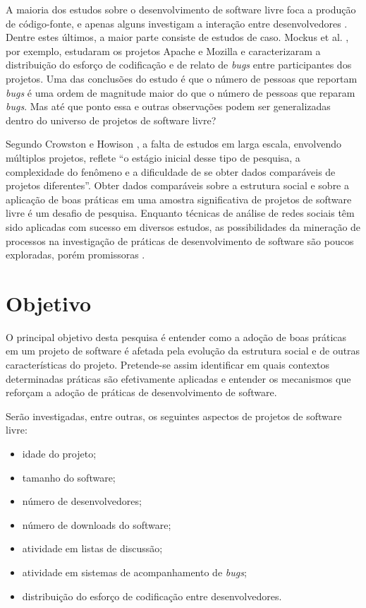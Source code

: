 \documentclass{article}
\begin{document}
A maioria dos estudos sobre o desenvolvimento de software livre foca a produção
de código-fonte, e apenas alguns investigam a interação entre desenvolvedores
\cite{crowston2005}. Dentre estes últimos, a maior parte consiste de estudos de
caso. Mockus et al. \cite{mockus2002}, por exemplo, estudaram os projetos Apache
e Mozilla e caracterizaram a distribuição do esforço de codificação e de relato
de \emph{bugs} entre participantes dos projetos. Uma das conclusões do estudo é
que o número de pessoas que reportam \emph{bugs} é uma ordem de magnitude maior
do que o número de pessoas que reparam \emph{bugs}. Mas até que ponto essa e
outras observações podem ser generalizadas dentro do universo de projetos de
software livre?

Segundo Crowston e Howison \cite{crowston2005}, a falta de estudos em larga
escala, envolvendo múltiplos projetos, reflete ``o estágio inicial desse tipo de
pesquisa, a complexidade do fenômeno e a dificuldade de se obter dados
comparáveis de projetos diferentes''. Obter dados comparáveis sobre a estrutura
social e sobre a aplicação de boas práticas em uma amostra significativa de
projetos de software livre é um desafio de pesquisa. Enquanto técnicas de
análise de redes sociais têm sido aplicadas com sucesso em diversos estudos, as
possibilidades da mineração de processos \cite{aalst2004} na investigação de
práticas de desenvolvimento de software são poucos exploradas, porém
promissoras \cite{rubin2007}.


\section{Objetivo}

O principal objetivo desta pesquisa é entender como a adoção de boas práticas em
um projeto de software é afetada pela evolução da estrutura social e de outras
características do projeto. Pretende-se assim identificar em quais contextos
determinadas práticas são efetivamente aplicadas e entender os mecanismos que
reforçam a adoção de práticas de desenvolvimento de software.

Serão investigadas, entre outras, os seguintes aspectos de projetos de software
livre:
\begin{itemize}
  \item idade do projeto;
  \item tamanho do software;
  \item número de desenvolvedores;
  \item número de downloads do software;
  \item atividade em listas de discussão;
  \item atividade em sistemas de acompanhamento de \emph{bugs};
  \item distribuição do esforço de codificação entre desenvolvedores.
\end{itemize}
\end{document}
